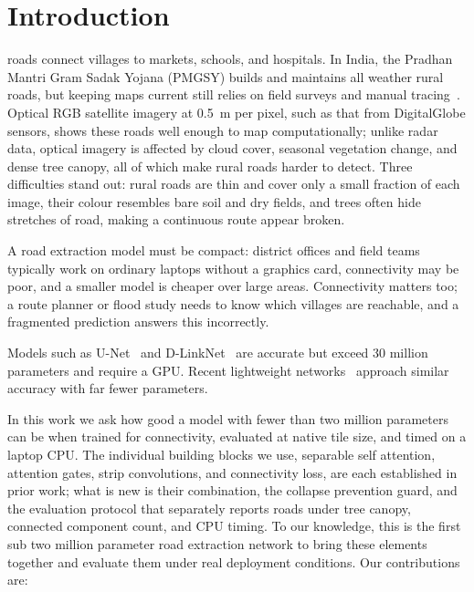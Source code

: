 \documentclass{ieeeaccess}
\begin{document}
\titlepgskip=-15pt

\maketitle

\section{Introduction}
\label{sec:introduction}

 roads connect villages to markets, schools, and hospitals. In India, the Pradhan Mantri Gram Sadak Yojana (PMGSY) builds and maintains all weather rural roads, but keeping maps current still relies on field surveys and manual tracing~\cite{pmgsy}. Optical RGB satellite imagery at 0.5~m per pixel, such as that from DigitalGlobe sensors, shows these roads well enough to map computationally; unlike radar data, optical imagery is affected by cloud cover, seasonal vegetation change, and dense tree canopy, all of which make rural roads harder to detect. Three difficulties stand out: rural roads are thin and cover only a small fraction of each image, their colour resembles bare soil and dry fields, and trees often hide stretches of road, making a continuous route appear broken.

A road extraction model must be compact: district offices and field teams typically work on ordinary laptops without a graphics card, connectivity may be poor, and a smaller model is cheaper over large areas. Connectivity matters too; a route planner or flood study needs to know which villages are reachable, and a fragmented prediction answers this incorrectly.

Models such as U-Net~\cite{ronneberger2015unet} and D-LinkNet~\cite{zhou2018dlinknet} are accurate but exceed 30 million parameters and require a GPU. Recent lightweight networks~\cite{cui2025hplnet} approach similar accuracy with far fewer parameters. 

In this work we ask how good a model with fewer than two million parameters can be when trained for connectivity, evaluated at native tile size, and timed on a laptop CPU. The individual building blocks we use, separable self attention, attention gates, strip convolutions, and connectivity loss, are each established in prior work; what is new is their combination, the collapse prevention guard, and the evaluation protocol that separately reports roads under tree canopy, connected component count, and CPU timing. To our knowledge, this is the first sub two million parameter road extraction network to bring these elements together and evaluate them under real deployment conditions. Our contributions are:
\end{document}
